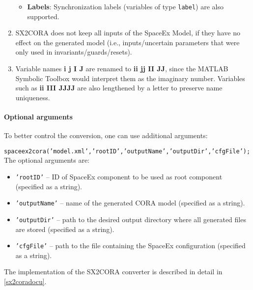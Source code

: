 \begin{enumerate}
\begin{itemize}
  \item \textbf{Labels}: Synchronization labels (variables of type \texttt{label}) are also supported.
\end{itemize}
\item SX2CORA does not keep all inputs of the SpaceEx Model, if they have no effect on the generated model (i.e., inputs/uncertain parameters that were only used in invariants/guards/resets).
\item Variable names \textbf{i j I J} are renamed to \textbf{ii jj II JJ}, since the MATLAB Symbolic Toolbox would interpret them as the imaginary number. Variables such as \textbf{ii III JJJJ} are also lengthened by a letter to preserve name uniqueness.
\end{enumerate}

\paragraph{Optional arguments} To better control the conversion, one can use additional arguments:

\texttt{spaceex2cora('model.xml','rootID','outputName','outputDir','cfgFile');} \\

The optional arguments are:
\begin{itemize}
 \item \texttt{'rootID'} -- ID of SpaceEx component to be used as root component (specified as a string).
 \item \texttt{'outputName'} -- name of the generated CORA model (specified as a string).
 \item \texttt{'outputDir'} -- path to the desired output directory where all generated files are stored (specified as a string).
 \item \texttt{'cfgFile'} -- path to the file containing the SpaceEx configuration (specified as a string).
\end{itemize}

The implementation of the SX2CORA converter is described in detail in \cref{sx2coradocu}.






